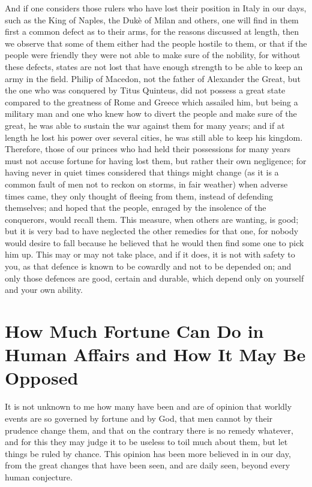 \documentclass[12pt,letterpaper]{memoir}
\begin{document}
And if one considers those rulers who have lost their position in
Italy in our days, such as the King of Naples, the Dukè of Milan and
others, one will find in them first a common defect as to their arms,
for the reasons discussed at length, then we observe that some of
them either had the people hostile to them, or that if the people were
friendly they were not able to make sure of the nobility, for without
these defects, states are not lost that have enough strength to be able
to keep an army in the field. Philip of Macedon, not the father of
Alexander the Great, but the one who was conquered by Titus Quinteus,
did not possess a great state compared to the greatness of Rome and
Greece which assailed him, but being a military man and one who knew
how to divert the people and make sure of the great, he was able to
sustain the war against them for many years; and if at length he lost
his power over several cities, he was still able to keep his kingdom.
Therefore, those of our princes who had held their possessions for many
years must not accuse fortune for having lost them, but rather their
own negligence; for having never in quiet times considered that things
might change (as it is a common fault of men not to reckon on storms,
in fair weather) when adverse times came, they only thought of fleeing
from them, instead of defending themselves; and hoped that the people,
enraged by the insolence of the conquerors, would recall them. This
measure, when others are wanting, is good; but it is very bad to have
neglected the other remedies for that one, for nobody would desire to
fall because he believed that he would then find some one to pick him
up. This may or may not take place, and if it does, it is not with
safety to you, as that defence is known to be cowardly and not to be
depended on; and only those defences are good, certain and durable,
which depend only on yourself and your own ability.

\chapter{How Much Fortune Can Do in Human Affairs and How It May Be Opposed}

It is not unknown to me how many have been and are of opinion that
worldly events are so governed by fortune and by God, that men cannot
by their prudence change them, and that on the contrary there is no
remedy whatever, and for this they may judge it to be useless to toil
much about them, but let things be ruled by chance. This opinion has
been more believed in in our day, from the great changes that have been
seen, and are daily seen, beyond every human conjecture.
\end{document}
